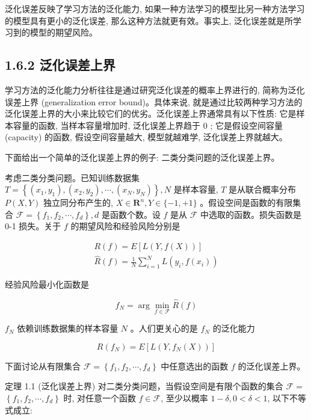 \documentclass[10pt]{article}
\begin{document}
泛化误差反映了学习方法的泛化能力, 如果一种方法学习的模型比另一种方法学习的模型具有更小的泛化误差, 那么这种方法就更有效。事实上, 泛化误差就是所学习到的模型的期望风险。

\subsection*{1.6.2 泛化误差上界}
学习方法的泛化能力分析往往是通过研究泛化误差的概率上界进行的, 简称为泛化误差上界 (generalization error bound)。具体来说, 就是通过比较两种学习方法的泛化误差上界的大小来比较它们的优劣。泛化误差上界通常具有以下性质: 它是样本容量的函数, 当样本容量增加时, 泛化误差上界趋于 0 ; 它是假设空间容量 (capacity) 的函数, 假设空间容量越大, 模型就越难学, 泛化误差上界就越大。

下面给出一个简单的泛化误差上界的例子: 二类分类问题的泛化误差上界。

考虑二类分类问题。已知训练数据集 $T=\left\{\left(x_{1}, y_{1}\right),\left(x_{2}, y_{2}\right), \cdots,\left(x_{N}, y_{N}\right)\right\}, N$ 是样本容量, $T$ 是从联合概率分布 $P(X, Y)$ 独立同分布产生的, $X \in \boldsymbol{R}^{n}, Y \in\{-1,+1\}$ 。假设空间是函数的有限集合 $\mathcal{F}=\left\{f_{1}, f_{2}, \cdots, f_{d}\right\}, d$ 是函数个数。设 $f$ 是从 $\mathcal{F}$ 中选取的函数。损失函数是 0-1 损失。关于 $f$ 的期望风险和经验风险分别是


\begin{gather*}
R(f)=E[L(Y, f(X))]  \tag{1.28}\\
\hat{R}(f)=\frac{1}{N} \sum_{i=1}^{N} L\left(y_{i}, f\left(x_{i}\right)\right) \tag{1.29}
\end{gather*}


经验风险最小化函数是


\begin{equation*}
f_{N}=\arg \min _{f \in \mathcal{F}} \hat{R}(f) \tag{1.30}
\end{equation*}


$f_{N}$ 依赖训练数据集的样本容量 $N$ 。人们更关心的是 $f_{N}$ 的泛化能力


\begin{equation*}
R\left(f_{N}\right)=E\left[L\left(Y, f_{N}(X)\right)\right] \tag{1.31}
\end{equation*}


下面讨论从有限集合 $\mathcal{F}=\left\{f_{1}, f_{2}, \cdots, f_{d}\right\}$ 中任意选出的函数 $f$ 的泛化误差上界。

定理 1.1 (泛化误差上界) 对二类分类问题，当假设空间是有限个函数的集合 $\mathcal{F}=$ $\left\{f_{1}, f_{2}, \cdots, f_{d}\right\}$ 时, 对任意一个函数 $f \in \mathcal{F}$, 至少以概率 $1-\delta, 0<\delta<1$, 以下不等式成立:
\end{document}
